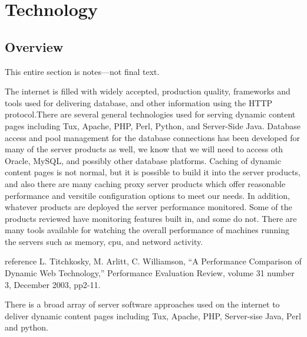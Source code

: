 
\chapter{Technology}

\section{Overview}

\begin{fixme}
This entire section is notes---not final text.
\end{fixme}

The internet is filled with widely accepted, production quality,
frameworks and tools used for delivering database, and other
information using the HTTP protocol.There are several general
technologies used for serving dynamic content pages including Tux,
Apache, PHP, Perl, Python, and Server-Side Java. Database access and
pool management for the database connections has been developed for
many of the server products as well, we know that we will need to
access oth Oracle, MySQL, and possibly other database
platforms. Caching of dynamic content pages is not normal, but it is
possible to build it into the server products, and also there are many
caching proxy server products which offer reasonable performance and
versitile configuration options to meet our needs.  In addition,
whatever products are deployed the server performance monitored. Some
of the products reviewed have monitoring features built in, and some
do not. There are many tools available for watching the overall
performance of machines running the servers such as memory, cpu, and
netword activity.

{reference L. Titchkosky, M. Arlitt, C. Williamson, ``A Performance
Comparison of Dynamic Web Technology,'' Performance Evaluation Review,
volume 31 number 3, December 2003, pp2-11.}

There is a broad array of server software approaches used on the
internet to deliver dynamic content pages including Tux, Apache, PHP,
Server-sise Java, Perl and python.

